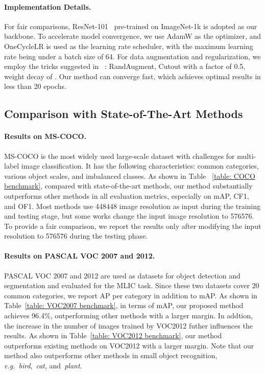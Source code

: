 \documentclass{ecai}
\def\eg{{\em e.g.}}
\begin{document}
\paragraph{Implementation Details.}
For fair comparisons, ResNet-101~\cite{He2016CVPR} pre-trained on ImageNet-1k is adopted as our backbone. 
To accelerate model convergence, we use AdamW as the optimizer, and OneCycleLR is used as the learning rate scheduler, with the maximum learning rate being  under a batch size of 64.
For data augmentation and regularization, we employ the tricks suggested in ~\cite{liu2021q2l}: RandAugment, Cutout with a factor of 0.5, weight decay of .
Our method can converge fast, which achieves optimal results in less than 20 epochs.
\subsection{Comparison with State-of-The-Art Methods}
\paragraph{Results on MS-COCO.}
MS-COCO is the most widely used large-scale dataset with challenges for multi-label image classification. It has the following characteristics: common categories, various object scales, and imbalanced classes.
As shown in Table ~\ref{table: COCO benchmark}, compared with state-of-the-art methods, our method substantially outperforms other methods in all evaluation metrics, especially on mAP, CF1, and OF1.
Most methods use 448448 image resolution as input during the training and testing stage, but some works change the input image resolution to 576576.
To provide a fair comparison, we report the results only after modifying the input resolution to 576576 during the testing phase.


\paragraph{Results on PASCAL VOC 2007 and 2012.}
PASCAL VOC 2007 and 2012 are used as datasets for object detection and segmentation and evaluated for the MLIC task.
Since these two datasets cover 20 common categories, we report AP per category in addition to mAP.
As shown in Table~\ref{table: VOC2007 benchmark}, in terms of mAP, our proposed method achieves 96.4\%, outperforming other methods with a larger margin.
In addtion, the increase in the number of images trained by VOC2012 futher influences the results. 
As shown in Table~\ref{table: VOC2012 benchmark}, our method outperforms existing methods on VOC2012 with a larger margin.
Note that our method also outperforms other methods in small object recognition, \eg{}~\textit{bird},~\textit{cat}, and~\textit{plant}.
\end{document}
